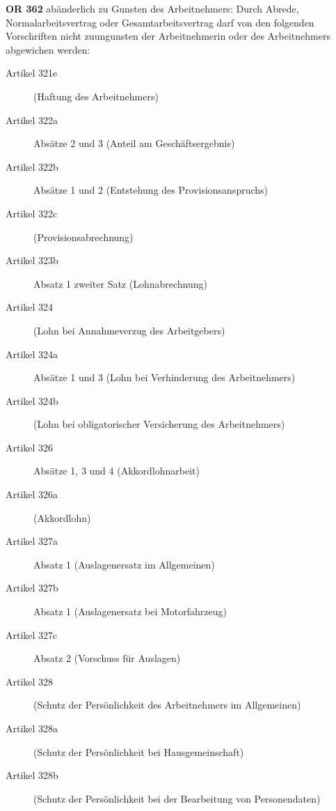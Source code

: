 \newpage
\textbf{OR 362} abänderlich zu Gunsten des Arbeitnehmers: Durch Abrede, Normalarbeitsvertrag oder Gesamtarbeitsvertrag darf von den folgenden Vorschriften nicht zuungunsten der Arbeitnehmerin oder des Arbeitnehmers abgewichen werden:
\begin{description}
  \item[Artikel 321e]
    (Haftung des Arbeitnehmers)

    \item[Artikel 322a]
    Absätze 2 und 3 (Anteil am Geschäftsergebnis)

    \item[Artikel 322b]
    Absätze 1 und 2 (Entstehung des Provisionsanspruchs)

    \item[Artikel 322c]
    (Provisionsabrechnung)

    \item[Artikel 323b]
    Absatz 1 zweiter Satz (Lohnabrechnung)

    \item[Artikel 324]
    (Lohn bei Annahmeverzug des Arbeitgebers)

    \item[Artikel 324a]
    Absätze 1 und 3 (Lohn bei Verhinderung des Arbeitnehmers)

    \item[Artikel 324b]
    (Lohn bei obligatorischer Versicherung des Arbeitnehmers)

    \item[Artikel 326]
    Absätze 1, 3 und 4 (Akkordlohnarbeit)

    \item[Artikel 326a]
    (Akkordlohn)

    \item[Artikel 327a]
    Absatz 1 (Auslagenersatz im Allgemeinen)

    \item[Artikel 327b]
    Absatz 1 (Auslagenersatz bei Motorfahrzeug)

    \item[Artikel 327c]
    Absatz 2 (Vorschuss für Auslagen)

    \item[Artikel 328]
    (Schutz der Persönlichkeit des Arbeitnehmers im Allgemeinen)

    \item[Artikel 328a]
    (Schutz der Persönlichkeit bei Hausgemeinschaft)

    \item[Artikel 328b]
    (Schutz der Persönlichkeit bei der Bearbeitung von Personendaten)


\end{description}

